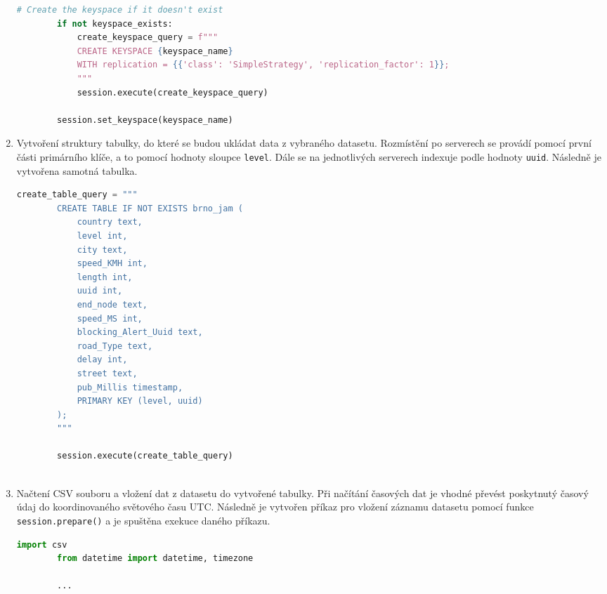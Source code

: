 \documentclass[a4paper, 11pt]{article}
\begin{document}
\begin{enumerate}
\begin{lstlisting}[style=Python, language=Python, framesep=10pt, breaklines=true]
        # Create the keyspace if it doesn't exist
        if not keyspace_exists:
            create_keyspace_query = f"""
            CREATE KEYSPACE {keyspace_name}
            WITH replication = {{'class': 'SimpleStrategy', 'replication_factor': 1}};
            """
            session.execute(create_keyspace_query)
    
        session.set_keyspace(keyspace_name)
            \end{lstlisting}

            \item Vytvoření struktury tabulky, do které se budou ukládat data z vybraného datasetu. Rozmístění po serverech se provádí pomocí první části primárního klíče, a to pomocí hodnoty sloupce \texttt{level}. Dále se na jednotlivých serverech indexuje podle hodnoty \texttt{uuid}. Následně je vytvořena samotná tabulka.

            \begin{lstlisting}[style=Python, language=Python, framesep=10pt]
        create_table_query = """
        CREATE TABLE IF NOT EXISTS brno_jam (
            country text,
            level int,
            city text,
            speed_KMH int,
            length int,
            uuid int,
            end_node text,
            speed_MS int,
            blocking_Alert_Uuid text,
            road_Type text,
            delay int,
            street text,
            pub_Millis timestamp,
            PRIMARY KEY (level, uuid)
        );
        """
    
        session.execute(create_table_query)
        
            \end{lstlisting}

            \item Načtení CSV souboru a vložení dat z datasetu do vytvořené tabulky. Při načítání časových dat je vhodné převést poskytnutý časový údaj do koordinovaného světového času UTC. Následně je vytvořen příkaz pro vložení záznamu datasetu pomocí funkce \texttt{session.prepare()} a je spuštěna exekuce daného příkazu.

            \begin{lstlisting}[style=Python, language=Python, framesep=10pt, breaklines=true]
        import csv
        from datetime import datetime, timezone

        ...
    

\end{lstlisting}
\end{enumerate}
\end{document}
